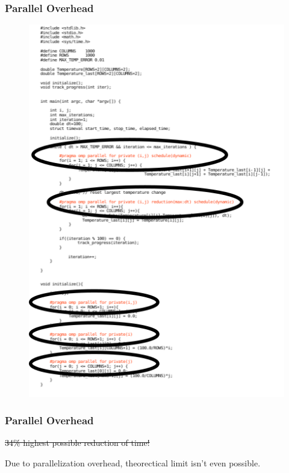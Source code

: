 \begin{frame}
		\frametitle{Parallel Overhead}
		\begin{figure}
				\includegraphics[width=0.4\linewidth]{figures/diagrams/amdahl/overhead}
		\end{figure}
\end{frame}

\begin{frame}
		\frametitle{Parallel Overhead}
		\sout{34\% highest possible reduction of time!}\newline

		\color{red}Due to parallelization overhead, theorectical limit isn't
even possible.
\end{frame}

